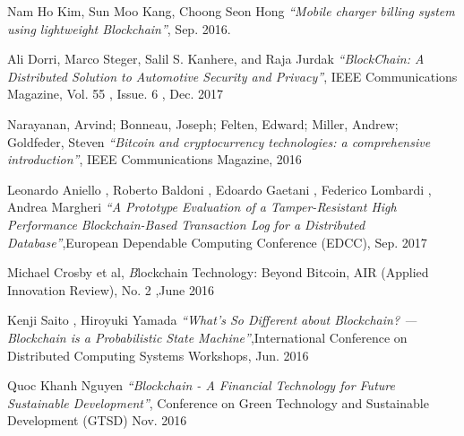 
\begin{thebibliography}{99}


 Nam Ho Kim, Sun Moo Kang, Choong Seon Hong \textit{``Mobile charger billing system using
lightweight Blockchain''}, Sep. 2016.

 Ali Dorri, Marco Steger, Salil S. Kanhere, and Raja Jurdak \textit{``BlockChain: A Distributed Solution
to Automotive Security and Privacy''}, IEEE Communications Magazine, Vol. 55 , Issue. 6 , Dec. 2017

 Narayanan, Arvind; Bonneau, Joseph; Felten, Edward; Miller, Andrew; Goldfeder, Steven \textit{``Bitcoin and cryptocurrency technologies: a comprehensive introduction''}, IEEE Communications Magazine, 2016

 Leonardo Aniello , Roberto Baldoni , Edoardo Gaetani , Federico Lombardi , Andrea Margheri \textit{``A Prototype Evaluation of a Tamper-Resistant High Performance Blockchain-Based Transaction Log for a Distributed Database''},European Dependable Computing Conference (EDCC), Sep. 2017

 Michael Crosby et al, \textit Blockchain Technology: Beyond Bitcoin, AIR (Applied Innovation Review), No. 2 ,June 2016

  Kenji Saito , Hiroyuki Yamada \textit{``What’s So Different about Blockchain? — Blockchain is a Probabilistic State Machine''},International Conference on Distributed Computing Systems Workshops, Jun. 2016

   Quoc Khanh Nguyen \textit{``Blockchain - A Financial Technology for Future Sustainable Development''}, Conference on Green Technology and Sustainable Development (GTSD)  Nov. 2016

\end{thebibliography}

